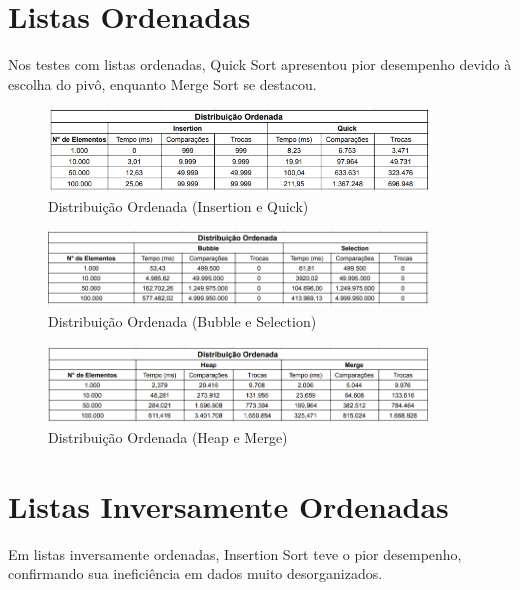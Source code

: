 \documentclass[12pt, a4paper]{report}
\begin{document}
\section{Listas Ordenadas}
Nos testes com listas ordenadas, Quick Sort apresentou pior desempenho devido à escolha do pivô, enquanto Merge Sort se destacou.
\begin{figure}[H]
    \centering
    \includegraphics[width=0.9\textwidth]{listas/ordenada1.png}
    \caption{Distribuição Ordenada (Insertion e Quick)}
    \label{fig:ordenada1}
\end{figure}
\begin{figure}[H]
    \centering
    \includegraphics[width=0.9\textwidth]{listas/ordenada2.png}
    \caption{Distribuição Ordenada (Bubble e Selection)}
    \label{fig:ordenada2}
\end{figure}
\begin{figure}[H]
    \centering
    \includegraphics[width=0.9\textwidth]{listas/ordenada3.png}
    \caption{Distribuição Ordenada (Heap e Merge)}
    \label{fig:ordenada3}
\end{figure}

\section{Listas Inversamente Ordenadas}
Em listas inversamente ordenadas, Insertion Sort teve o pior desempenho, confirmando sua ineficiência em dados muito desorganizados.
\end{document}
